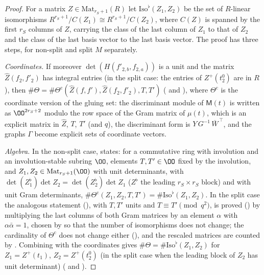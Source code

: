 \begin{proof}
For a matrix $Z\in\mathrm{Mat}_{r_S+1}(R)$ let $\mathrm{Iso}^\flat(Z_1,Z_2)$ be the set of $R$-linear isomorphisms
$R^{r_S+1}/C(Z_1)\cong R^{r_S+1}/C(Z_2)$, where $C(Z)$ is spanned by the first $r_S$ columns of $Z$, carrying the class of the last column of $Z_1$ to
that of $Z_2$ and the class of the last basis vector to the last basis vector. The proof has three steps, for non-split and
split $M$ separately.

\emph{Coordinates.} If moreover $\det(H(f'_{2,b},f_{2,a}))$ is a unit and the matrix $\widehat Z(f_2,f'_2)$ has integral entries (in the split
case: the entries of $Z^+(t_2^0)$ are in $R$), then $\#\Theta=\#\Theta^{\mathrm c}(\widehat Z(f,f'),\widehat Z(f_2,f'_2),T,T')$
( and ),
where $\Theta^{\mathrm c}$ is the coordinate version of the gluing set: the discriminant module of $\mathsf M(t)$ is written as $\OO^{2r_S+2}$
modulo the row space of the Gram matrix of $\mu(t)$, which is an explicit matrix in $\widehat Z$, $T$, $T'$ (and $q$), the discriminant form is
$Y\,G^{-1}\,\overline W^{\,\top}$, and the graphs $\Gamma$ become explicit sets of coordinate vectors.

\emph{Algebra.} In the non-split case,  states:
for a commutative ring with involution and an involution-stable subring $\OO$, elements $T,T'\in\OO$ fixed by the involution, and
$Z_1,Z_2\in\mathrm{Mat}_{r_S+1}(\OO)$ with unit determinants, with $\det(Z_1^\flat)\det Z_2=\det(Z_2^\flat)\det Z_1$ ($Z^\flat$ the leading
$r_S\times r_S$ block) and with unit Gram determinants, $\#\Theta^{\mathrm c}(Z_1,Z_2,T,T')=\#\mathrm{Iso}^\flat(Z_1,Z_2)$. In the split case the
analogous statement (), with $T,T'$ units and
$T\equiv T'\pmod{q^2}$, is proved () by multiplying the last
columns of both Gram matrices by an element $\alpha$ with $\alpha\bar\alpha=1$, chosen by
 so that the number of isomorphisms does not change; the
cardinality of $\Theta^{\mathrm c}$ does not change either (),
and the rescaled matrices are counted by .
Combining with the coordinates gives $\#\Theta=\#\mathrm{Iso}^\flat(Z_1,Z_2)$ for $Z_1=Z^+(t_1)$, $Z_2=Z^+(t_2^0)$ (in the split case when the
leading block of $Z_2$ has unit determinant)
( and ).


\end{proof}
